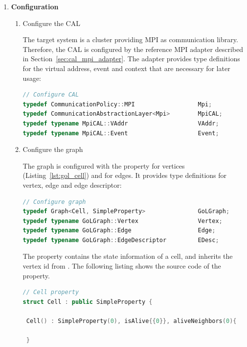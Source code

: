 \begin{enumerate}

\item \textbf{Configuration}
\begin{enumerate}

\item Configure the CAL
  
  The target system is a cluster providing MPI as communication
  library. Therefore, the CAL is configured by the reference MPI adapter
  described in Section~\ref{sec:cal_mpi_adapter}. The adapter provides
  type definitions for the virtual address, event and context that are
  necessary for later usage:

  \begin{lstlisting}[language=C++, label=lst:conf_cal, caption={\ }]
// Configure CAL
typedef CommunicationPolicy::MPI                  Mpi;
typedef CommunicationAbstractionLayer<Mpi>        MpiCAL;
typedef typename MpiCAL::VAddr                    VAddr;
typedef typename MpiCAL::Event                    Event;
  \end{lstlisting}

\item Configure the graph

  The graph is configured with the property  for vertices
  (Listing~\ref{lst:gol_cell}) and  for edges. It
  provides type definitions for vertex, edge and edge descriptor:

  \begin{lstlisting}[language=C++, label=lst:conf_graph, caption={\ }]
// Configure graph
typedef Graph<Cell, SimpleProperty>               GoLGraph;
typedef typename GoLGraph::Vertex                 Vertex;
typedef typename GoLGraph::Edge                   Edge;
typedef typename GoLGraph::EdgeDescriptor         EDesc;
  \end{lstlisting}

  The  property contains the state information of a cell,
  and inherits the vertex id from .  The following
  listing shows the source code of the  property.
  
  \begin{lstlisting}[language=C++, label=lst:gol_cell, caption={\ }]
// Cell property    
struct Cell : public SimpleProperty { 

 Cell() : SimpleProperty(0), isAlive{{0}}, aliveNeighbors(0){ 
          
 }
        

\end{lstlisting}
\end{enumerate}
\end{enumerate}
